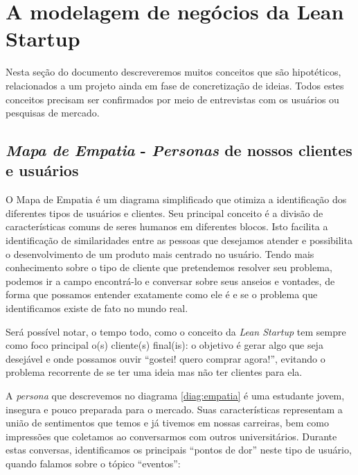 \documentclass[12pt,a4paper,twoside,hyphens,english,brazil]{abntex2}
\newcommand{\hip}{{\color{BlueViolet}\framebox[1.1\width]{HIP}}}
\newcommand{\conf}{{\color{OliveGreen}\framebox[1.1\width]{CNF}}}
\begin{document}

\section{A modelagem de negócios da Lean Startup} \label{sec:modelagem-negocios}

Nesta seção do documento descreveremos muitos conceitos que são hipotéticos, relacionados a um projeto ainda em fase de concretização de ideias. Todos estes conceitos precisam ser confirmados por meio de entrevistas com os usuários ou pesquisas de mercado.\\


\subsection{\emph{Mapa de Empatia} - \emph{Personas} de nossos clientes e usuários}
O Mapa de Empatia\cite{mapa-de-empatia} é um diagrama simplificado que otimiza a identificação dos diferentes tipos de usuários e clientes. Seu principal conceito é a divisão de características comuns de seres humanos em diferentes blocos. Isto facilita a identificação de similaridades entre as pessoas que desejamos atender e possibilita o desenvolvimento de um produto mais centrado no usuário. Tendo mais conhecimento sobre o tipo de cliente que pretendemos resolver seu problema, podemos ir a campo encontrá-lo e conversar sobre seus anseios e vontades, de forma que possamos entender exatamente como ele é e se o problema que identificamos existe de fato no mundo real.

Será possível notar, o tempo todo, como o conceito da \emph{Lean Startup} tem sempre como foco principal o(s) cliente(s) final(is): o objetivo é gerar algo que seja desejável e onde possamos ouvir ``gostei! quero comprar agora!'', evitando o problema recorrente de se ter uma ideia mas não ter clientes para ela.

A \emph{persona}\footnotemark{} que descrevemos no diagrama \ref{diag:empatia} é uma estudante jovem, insegura e pouco preparada para o mercado. Suas características representam a união de sentimentos que temos e já tivemos em nossas carreiras, bem como impressões que coletamos ao conversarmos com outros universitários. Durante estas conversas, identificamos os principais ``pontos de dor'' neste tipo de usuário, quando falamos sobre o tópico ``eventos'':
\end{document}

